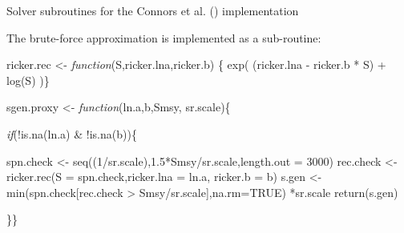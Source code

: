 \documentclass[french,11pt]{book}
\newenvironment{Shaded}{\begin{snugshade}}{\end{snugshade}}
\newcommand{\AttributeTok}[1]{\textcolor[rgb]{0.77,0.63,0.00}{#1}}
\newcommand{\ConstantTok}[1]{\textcolor[rgb]{0.00,0.00,0.00}{#1}}
\newcommand{\ControlFlowTok}[1]{\textcolor[rgb]{0.13,0.29,0.53}{\textit{#1}}}
\newcommand{\DecValTok}[1]{\textcolor[rgb]{0.00,0.00,0.81}{#1}}
\newcommand{\FloatTok}[1]{\textcolor[rgb]{0.00,0.00,0.81}{#1}}
\newcommand{\FunctionTok}[1]{\textcolor[rgb]{0.00,0.00,0.00}{#1}}
\newcommand{\NormalTok}[1]{#1}
\newcommand{\OtherTok}[1]{\textcolor[rgb]{0.56,0.35,0.01}{#1}}
\newcommand{\SpecialCharTok}[1]{\textcolor[rgb]{0.00,0.00,0.00}{#1}}
\begin{document}
Solver subroutines for the Connors et al. () implementation
\begin{Shaded}
\end{Shaded}
The brute-force approximation is implemented as a sub-routine:
\begin{Shaded}
\begin{Highlighting}[]
\NormalTok{ricker.rec  }\OtherTok{\textless{}{-}} \ControlFlowTok{function}\NormalTok{(S,ricker.lna,ricker.b) \{}
                                \FunctionTok{exp}\NormalTok{( (ricker.lna }\SpecialCharTok{{-}}\NormalTok{ ricker.b }\SpecialCharTok{*}\NormalTok{ S) }\SpecialCharTok{+} \FunctionTok{log}\NormalTok{(S) )\}}

\NormalTok{sgen.proxy }\OtherTok{\textless{}{-}} \ControlFlowTok{function}\NormalTok{(ln.a,b,Smsy, sr.scale)\{}

\ControlFlowTok{if}\NormalTok{(}\SpecialCharTok{!}\FunctionTok{is.na}\NormalTok{(ln.a) }\SpecialCharTok{\&} \SpecialCharTok{!}\FunctionTok{is.na}\NormalTok{(b))\{}

\NormalTok{spn.check }\OtherTok{\textless{}{-}} \FunctionTok{seq}\NormalTok{((}\DecValTok{1}\SpecialCharTok{/}\NormalTok{sr.scale),}\FloatTok{1.5}\SpecialCharTok{*}\NormalTok{Smsy}\SpecialCharTok{/}\NormalTok{sr.scale,}\AttributeTok{length.out =} \DecValTok{3000}\NormalTok{)}
\NormalTok{rec.check }\OtherTok{\textless{}{-}}  \FunctionTok{ricker.rec}\NormalTok{(}\AttributeTok{S =}\NormalTok{ spn.check,}\AttributeTok{ricker.lna =}\NormalTok{ ln.a, }\AttributeTok{ricker.b =}\NormalTok{ b)}
\NormalTok{s.gen }\OtherTok{\textless{}{-}} \FunctionTok{min}\NormalTok{(spn.check[rec.check }\SpecialCharTok{\textgreater{}}\NormalTok{ Smsy}\SpecialCharTok{/}\NormalTok{sr.scale],}\AttributeTok{na.rm=}\ConstantTok{TRUE}\NormalTok{) }\SpecialCharTok{*}\NormalTok{sr.scale}
\FunctionTok{return}\NormalTok{(s.gen)}

\NormalTok{\}\}}
\end{Highlighting}
\end{Shaded}
\label{EquProfFuns}
\end{document}
